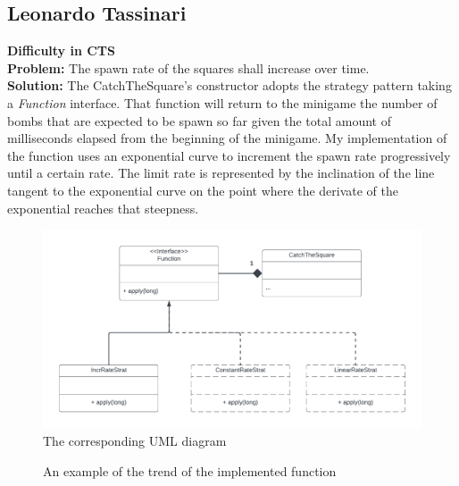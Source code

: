\documentclass[a4paper,12pt]{report}
\begin{document}
\subsection*{Leonardo Tassinari}
\textbf{Difficulty in CTS}\\
\textbf{Problem:} The spawn rate of the squares shall increase over time.\\
\textbf{Solution:} The CatchTheSquare's constructor adopts the strategy pattern taking a \textit{Function} interface. That function will return to the minigame the number of bombs that are expected to be spawn so far given the total amount of milliseconds elapsed from the beginning of the minigame.
My implementation of the function uses an exponential curve to increment the spawn rate progressively until a certain rate.
The limit rate is represented by the inclination of the line tangent to the exponential curve on the point where the derivate of the exponential reaches that steepness.\\
\begin{figure}[ht]
	\centering
	\includegraphics[width=\textwidth]{res/RateStrat.pdf}
	\caption{The corresponding UML diagram}
\end{figure}
\begin{figure}[ht]
	\centering
	\caption{An example of the trend of the implemented function}
\end{figure}
\end{document}
